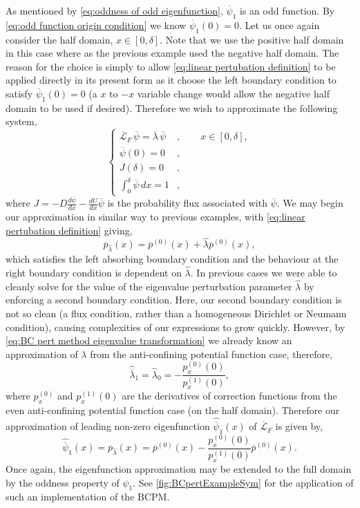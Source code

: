 \documentclass[11pt]{amsart}
\begin{document}
As mentioned by \cref{eq:oddness of odd eigenfunction}, $\overline{\psi}_1$ is an odd function. By \cref{eq:odd function origin condition} we know $\overline{\psi}_1(0)=0$. Let us once again consider the half domain, $x\in[0,\delta]$. Note that we use the positive half domain in this case where as the previous example used the negative half domain. The reason for the choice is simply to allow \cref{eq:linear pertubation definition} to be applied directly in its present form as it choose the left boundary condition to satisfy $\overline{\psi}_1(0)=0$ (a $x$ to $-x$ variable change would allow the negative half domain to be used if desired). Therefore we wish to approximate the following system,
\begin{equation}
\left\{
\begin{aligned}
\overline{\mathcal{L}}_{F}\, \overline{\psi} = \overline{\lambda} \,\overline{\psi} &, \qquad x \in [0, \delta], \\
\overline{\psi}(0) = 0&, \\
J(\delta) = 0&, \\
\int_0^{\delta}\overline{\psi} \, dx = 1&,
\end{aligned}
\right.
\end{equation}
where $J=-D\frac{d\overline{\psi}}{dx} -\frac{dU}{dx}\overline{\psi}$ is the probability flux associated with $\overline{\psi}$. We may begin our approximation in similar way to previous examples, with \cref{eq:linear pertubation definition} giving,
\begin{equation*}
    \overline{p}_{\hat{\lambda}}(x) = \overline{p}^{(0)}(x) + \hat{\lambda} \overline{p}^{(0)}(x),
\end{equation*}
which satisfies the left absorbing boundary condition and the behaviour at the right boundary condition is dependent on $\hat{\lambda}$. In previous cases we were able to cleanly solve for the value of the eigenvalue perturbation parameter $\hat{\lambda}$ by enforcing a second boundary condition. Here, our second boundary condition is not so clean (a flux condition, rather than a homogeneous Dirichlet or Neumann condition), causing complexities of our expressions to grow quickly. However, by \cref{eq:BC pert method eigenvalue transformation} we already know an approximation of $\lambda$ from the anti-confining potential function case, therefore,
\begin{equation*}
    \hat{\overline{\lambda}}_1 =\hat{\lambda}_0 = -\frac{p_x^{(0)}(0)}{p_x^{(1)}(0)},
\end{equation*}
where $p_x^{(0)}$ and $p^{(1)}_x(0)$ are the derivatives of correction functions from the even anti-confining potential function case (on the half domain). Therefore our approximation of leading non-zero eigenfunction $\hat{\overline{\psi}}_1(x)$ of $\overline{\mathcal{L}}_{F}$  is given by,
\begin{equation*}
    \hat{\overline{\psi}}_1(x) = \overline{p}_{\hat{\lambda}}(x) = \overline{p}^{(0)}(x) -\frac{p_x^{(0)}(0)}{p_x^{(1)}(0)} \overline{p}^{(0)}(x).
\end{equation*}
Once again, the eigenfunction approximation may be extended to the full domain by the oddness property of $\psi_1$. See \cref{fig:BCpertExampleSym} for the application of such an implementation of the BCPM.
\end{document}
